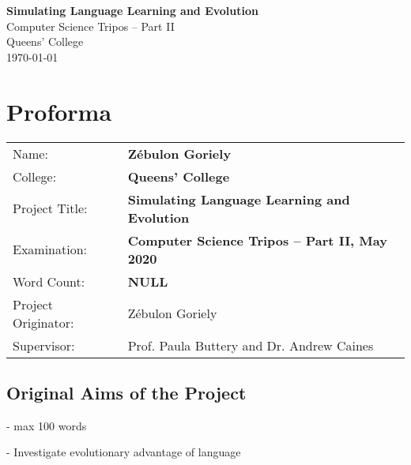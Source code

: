 \documentclass[12pt,a4paper,twoside,openright]{report}
\begin{document}


\pagestyle{empty}


\vspace*{60mm}
\begin{center}
\Huge
\textbf{Simulating Language Learning and Evolution} \\[5mm]
Computer Science Tripos -- Part II \\[5mm]
Queens' College \\[5mm]
\today  %
\end{center}


\pagestyle{plain}

\chapter*{Proforma}

{\large
\begin{tabular}{ll}
Name:               & \bf Z\'ebulon Goriely                       \\
College:            & \bf Queens' College                     \\
Project Title:      & \bf Simulating Language Learning and Evolution \\
Examination:        & \bf Computer Science Tripos -- Part II, May 2020  \\
Word Count:         & \bf NULL\footnotemark[1]  \\
Project Originator: & Z\'ebulon Goriely                    \\
Supervisor:         & Prof. Paula Buttery and Dr. Andrew Caines                  \\ 
\end{tabular}
}


\section*{Original Aims of the Project}

- max 100 words

- Investigate evolutionary advantage of language
\end{document}
